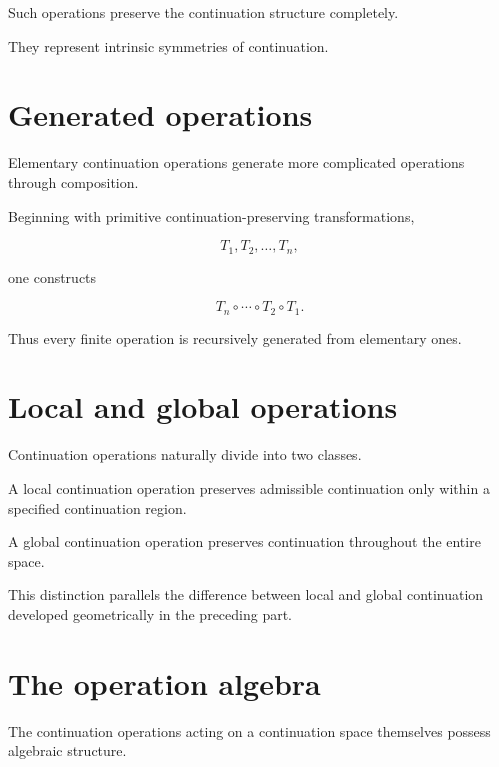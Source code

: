 \documentclass[13pt,openany]{book}
\theoremstyle{plain}
\theoremstyle{definition}
\begin{document}
Such operations preserve the continuation structure completely.

They represent intrinsic symmetries of continuation.

\section{Generated operations}

Elementary continuation operations generate more complicated operations through
composition.

Beginning with primitive continuation-preserving transformations,

\[
T_1,T_2,\ldots,T_n,
\]

one constructs

\[
T_n\circ\cdots\circ T_2\circ T_1.
\]

Thus every finite operation is recursively generated from elementary ones.

\section{Local and global operations}

Continuation operations naturally divide into two classes.

A local continuation operation preserves admissible continuation only within a
specified continuation region.

A global continuation operation preserves continuation throughout the entire
space.

This distinction parallels the difference between local and global continuation
developed geometrically in the preceding part.

\section{The operation algebra}

The continuation operations acting on a continuation space themselves possess
algebraic structure.
\end{document}
